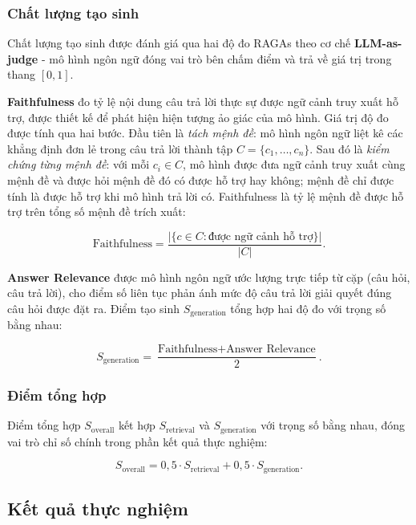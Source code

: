 \subsubsection{Chất lượng tạo sinh}

Chất lượng tạo sinh được đánh giá qua hai độ đo RAGAs theo cơ chế \textbf{LLM-as-judge} - mô hình ngôn ngữ đóng vai trò bên chấm điểm và trả về giá trị trong thang $[0, 1]$.

\textbf{Faithfulness} đo tỷ lệ nội dung câu trả lời thực sự được ngữ cảnh truy xuất hỗ trợ, được thiết kế để phát hiện hiện tượng ảo giác của mô hình. Giá trị độ đo được tính qua hai bước. Đầu tiên là \textit{tách mệnh đề}: mô hình ngôn ngữ liệt kê các khẳng định đơn lẻ trong câu trả lời thành tập $C = \{c_1, \ldots, c_n\}$. Sau đó là \textit{kiểm chứng từng mệnh đề}: với mỗi $c_i \in C$, mô hình được đưa ngữ cảnh truy xuất cùng mệnh đề và được hỏi mệnh đề đó có được hỗ trợ hay không; mệnh đề chỉ được tính là được hỗ trợ khi mô hình trả lời có. Faithfulness là tỷ lệ mệnh đề được hỗ trợ trên tổng số mệnh đề trích xuất:

\begin{equation}
\text{Faithfulness} = \frac{|\{c \in C : \text{được ngữ cảnh hỗ trợ}\}|}{|C|}.
\end{equation}

\textbf{Answer Relevance} được mô hình ngôn ngữ ước lượng trực tiếp từ cặp (câu hỏi, câu trả lời), cho điểm số liên tục phản ánh mức độ câu trả lời giải quyết đúng câu hỏi được đặt ra. Điểm tạo sinh $S_{\text{generation}}$ tổng hợp hai độ đo với trọng số bằng nhau:

\begin{equation}
S_{\text{generation}} = \frac{\text{Faithfulness} + \text{Answer Relevance}}{2}.
\end{equation}

\subsubsection{Điểm tổng hợp}

Điểm tổng hợp $S_{\text{overall}}$ kết hợp $S_{\text{retrieval}}$ và $S_{\text{generation}}$ với trọng số bằng nhau, đóng vai trò chỉ số chính trong phần kết quả thực nghiệm:

\begin{equation}
S_{\text{overall}} = 0,5 \cdot S_{\text{retrieval}} + 0,5 \cdot S_{\text{generation}}.
\end{equation}

\subsection{Kết quả thực nghiệm}
\label{sec:benchmark_results}

